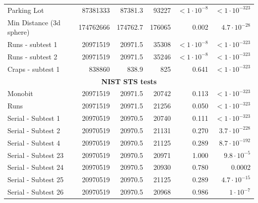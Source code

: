 \documentclass[
	digital,    %
	oneside,    %
	color,
	11pt,
	nocover,
	notable,
	nolof,
	nolot,
]{fithesis3}
\newcommand{\rd}{\cellcolor{red!40}}
\theoremstyle{definition}
\theoremstyle{remark}
\begin{document}
\begin{table}[H]
\begin{nomar}
{\begin{tabular}{@{}lrrrrr@{}}
Parking Lot                    & 87381333          & 87381.3       & 93227         & $<1\cdot 10^{-8}$  \rd & $<1\cdot 10^{-323}$   \rd \\
Min Distance (3d sphere)       & 174762666         & 174762.7      & 176065        & 0.002                  & $4.7 \cdot 10^{-28}$  \rd \\
Runs - subtest 1               & 20971519          & 20971.5       & 35308         & $<1\cdot 10^{-8}$  \rd & $<1\cdot 10^{-323}$   \rd \\
Runs - subtest 2               & 20971519          & 20971.5       & 35246         & $<1\cdot 10^{-8}$  \rd & $<1\cdot 10^{-323}$   \rd \\
Craps - subtest 1              & 838860            & 838.9         & 825           & 0.641                  & $<1\cdot 10^{-323}$   \rd \\ \midrule
\multicolumn{6}{c}{\textbf{NIST STS tests}} \\ \midrule
Monobit                        & 20971519          & 20971.5       & 20742         & 0.113                  & $<1\cdot 10^{-323}$   \rd \\
Runs                           & 20971519          & 20971.5       & 21256         & 0.050                  & $<1\cdot 10^{-323}$   \rd \\ 
Serial - Subtest 1             & 20970519          & 20970.5       & 20740         & 0.111                  & $<1\cdot 10^{-323}$   \rd \\
Serial - Subtest 2             & 20970519          & 20970.5       & 21131         & 0.270                  & $3.7 \cdot 10^{-228}$ \rd \\ 
Serial - Subtest 4             & 20970519          & 20970.5       & 21125         & 0.289                  & $8.7 \cdot 10^{-192}$ \rd \\ 
Serial - Subtest 23            & 20970519          & 20970.5       & 20971         & 1.000                  & $9.8 \cdot 10^{-5}$   \rd \\ 
Serial - Subtest 24            & 20970519          & 20970.5       & 20930         & 0.780                  & 0.0002                \rd \\ 
Serial - Subtest 25            & 20970519          & 20970.5       & 21125         & 0.289                  & $4.7 \cdot 10^{-15}$  \rd \\
Serial - Subtest 26            & 20970519          & 20970.5       & 20968         & 0.986                  & $1 \cdot 10^{-7}$     \rd \\

\end{tabular}}
\end{nomar}
\end{table}
\end{document}
